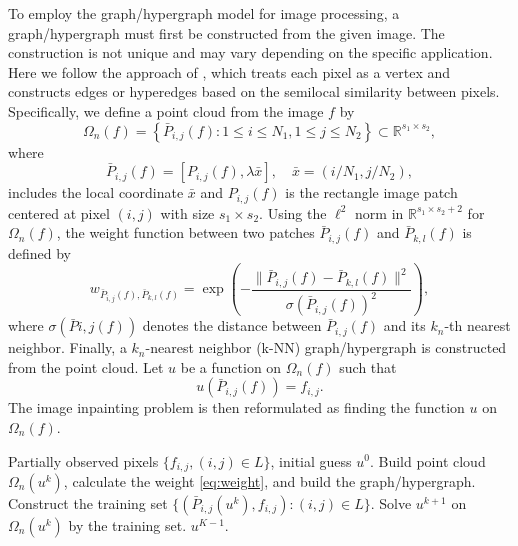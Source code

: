 \documentclass{article}
\newcommand{\R}{\mathbb{R}}
\theoremstyle{definition}
\begin{document}
To employ the graph/hypergraph model for image processing, a graph/hypergraph must first be constructed from the given image. The construction is not unique and may vary depending on the specific application.
Here we follow the approach of \cite{shi2017weighted,shi2025hypergraph}, which treats each pixel as a vertex and constructs edges or hyperedges based on the semilocal similarity between pixels.
Specifically, we define a point cloud from the image $f$ by
\begin{equation*}
  \Omega_n(f)=\left\{\bar{P}_{i,j}(f): 1\leq i\leq N_1, 1\leq j\leq N_2\right\}\subset \mathbb{R}^{s_1\times s_2},
\end{equation*}
where
\begin{equation*}
  \bar{P}_{i,j}(f)=[P_{i,j}(f), \lambda\bar{x}], \quad \bar{x}=\left({i}/{N_1}, {j}/{N_2}\right),
\end{equation*}
includes the local coordinate $\bar{x}$
and $P_{i,j}(f)$ is the rectangle image patch centered at pixel $(i,j)$ with size $s_1\times s_2$.
Using the $\ell^2$ norm in $\R^{s_1\times s_2 +2}$ for $\Omega_n(f)$,
the weight function between two patches $\bar{P}_{i,j}(f)$ and $\bar{P}_{k,l}(f)$ is defined by
\begin{equation}\label{eq:weight}
  w_{\bar{P}_{i,j}(f),\bar{P}_{k,l}(f)}=\exp\left(-\frac{\|\bar{P}_{i,j}(f)-\bar{P}_{k,l}(f)\|^2}
  {\sigma(\bar{P}_{i,j}(f))^2}\right),
\end{equation}
where $\sigma(\bar{P}{i,j}(f))$ denotes the distance between $\bar{P}_{i,j}(f)$ and its $k_n$-th nearest neighbor.
Finally, a $k_n$-nearest neighbor (k-NN) graph/hypergraph is constructed from the point cloud.
Let $u$ be a function on $\Omega_n(f)$ such that
\begin{equation*}
  u(\bar{P}_{i,j}(f))=f_{i,j}.
\end{equation*}
The image inpainting problem is then reformulated as finding the function $u$ on $\Omega_n(f)$.


\begin{algorithm}[tbp]
  \caption{Image sparse inpainting.}
  \label{alg3}
  \begin{algorithmic}
  \REQUIRE Partially observed pixels $\{f_{i,j},(i,j)\in L\}$, initial guess $u^0$.
  \STATE Build point cloud $\Omega_n(u^k)$, calculate the weight \eqref{eq:weight}, and build the graph/hypergraph.
  \STATE Construct the training set $\{(\bar{P}_{i,j}(u^k), f_{i,j}): (i,j)\in L\}$.
  \STATE Solve $u^{k+1}$ on $\Omega_n(u^k)$ by the training set.
  \ENDFOR
  \RETURN $u^{K-1}$.
  \end{algorithmic}
\end{algorithm}
\end{document}
